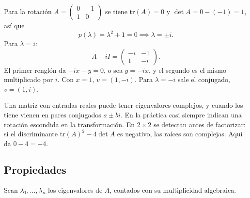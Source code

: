 \documentclass[11pt,letterpaper]{article}
\begin{document}
\begin{ejemplo}
    Para la rotación
    $A = \begin{pmatrix} 0 & -1 \\ 1 & 0 \end{pmatrix}$ se tiene
    $\mathrm{tr}(A) = 0$ y $\det A = 0 - (-1) = 1$, así que
    \[
        p(\lambda) = \lambda^2 + 1 = 0
        \implies \lambda = \pm i .
    \]
    Para $\lambda = i$:
    \[
        A - iI = \begin{pmatrix} -i & -1 \\ 1 & -i \end{pmatrix} .
    \]
    El primer renglón da $-ix - y = 0$, o sea $y = -ix$, y el segundo
    es el mismo multiplicado por $i$. Con $x = 1$, $v = (1, -i)$. Para
    $\lambda = -i$ sale el conjugado, $v = (1, i)$.
\end{ejemplo}

\begin{ojo}
    Una matriz con entradas reales puede tener eigenvalores complejos,
    y cuando los tiene vienen en pares conjugados $a \pm bi$. En la
    práctica casi siempre indican una rotación escondida en la
    transformación. En $2 \times 2$ se detectan antes de factorizar:
    si el discriminante $\mathrm{tr}(A)^2 - 4\det A$ es negativo, las
    raíces son complejas. Aquí da $0 - 4 = -4$.
\end{ojo}


\subsection*{Propiedades}

Sean $\lambda_1, \ldots, \lambda_n$ los eigenvalores de $A$, contados
con su multiplicidad algebraica.
\end{document}
